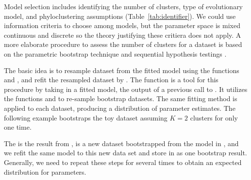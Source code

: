 Model selection includes identifying the number of clusters, type of evolutionary model, and phyloclustering assumptions (Table~\ref{tab:identifier}).
We could use information criteria to choose among models, but the parameter space is mixed continuous and discrete so the theory justifying these critiera does not apply.
A more elaborate procedure to assess the number of clusters
for a dataset is based on the parametric bootstrap
technique and sequential hypothesis testings \citep{Maitra2010}.

The basic idea is to resample dataset from the fitted model using the
functions  and ,
and refit the resampled dataset by .
The  function is a tool for this procedure
by taking in a fitted model, the output of a previous call to .
It utilizes the functions  and 
to re-sample bootstrap datasets. The same fitting method is applied to each
dataset, producing a distribution of parameter estimates.
The following example bootstraps the toy dataset assuming $K=2$ clusters
for only one time.

The  is the result from ,
 is a new dataset bootstrapped from
the model in , and we refit the same model to
this new data set and store in  as one
bootstrap result.
Generally, we need to repeat these steps for several times to obtain
an expected distribution for parameters.

